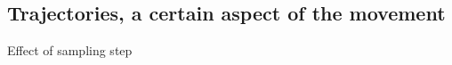 \documentclass{beamer}\usepackage[]{graphicx}\usepackage[]{color}
\begin{document}
\subsection*{Trajectories, a certain aspect of the movement}
\begin{frame}[fragile]{Effect of sampling step}


\end{frame}
\end{document}
